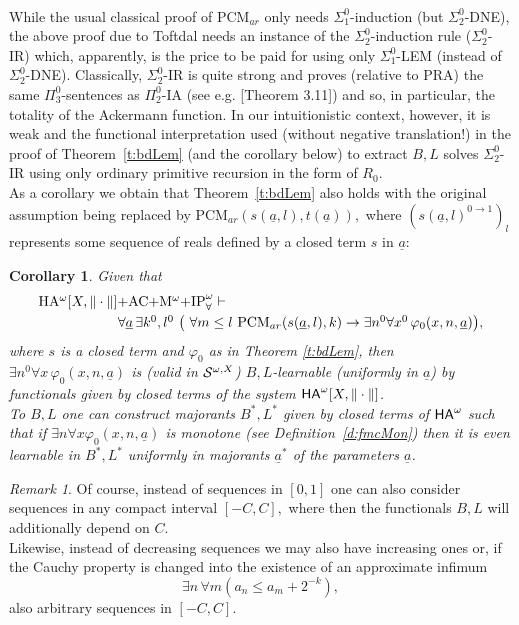 \documentclass[1p]{elsarticle}
\newcommand{\usftext}[1]{\textsf{\upshape #1}}
\newcommand{\ba}{\begin{array}} \newcommand{\ea}{\end{array}}
\newcommand{\ha}{\ensuremath{{\usftext{HA}}^\omega}} %
\newcommand{\tup}{\underline} %
\theoremstyle{plain}
\newtheorem{cor}[thm]{Corollary}
\theoremstyle{definition}
\theoremstyle{remark}
\newtheorem*{remark}{Remark}
\renewcommand{\phi}{\varphi}
\theoremstyle{definition}
\begin{document}
{\mbox{ } 

While the usual classical proof of PCM$_{ar}$ only needs $\Sigma^0_1$-induction 
(but $\Sigma^0_2$-DNE), the above proof due to Toftdal needs an instance of 
the $\Sigma^0_2$-induction rule ($\Sigma^0_2$-IR) which, apparently, is the 
price to be paid for using only $\Sigma^0_1$-LEM (instead of 
$\Sigma^0_2$-DNE). Classically, $\Sigma^0_2$-IR is quite strong and proves 
(relative to PRA) the same $\Pi^0_3$-sentences as $\Pi^0_2$-IA 
(see e.g. \cite{Sieg}[Theorem 3.11]) and so, 
in particular, the totality of the Ackermann function. In our intuitionistic 
context, however, it is weak and the functional interpretation used 
(without negative translation!) in the 
proof of Theorem~\ref{t:bdLem} (and the corollary below) to extract $B,L$ solves 
$\Sigma^0_2$-IR using only ordinary primitive recursion in the form of 
$R_0.$ 
\\[2mm]
As a corollary we obtain that Theorem~\ref{t:bdLem} also holds with 
the original assumption being replaced by 
PCM$_{ar}(s(\underline{a},l),t(\underline{a})),$ where 
$(s(\underline{a},l)^{0\to 1})_l$ represents some sequence of reals defined by 
a closed term $s$ in $\underline{a}:$
\begin{cor}
Given that 
\[\ba{l} \mbox{\rm HA$^{\omega}[X,\|\cdot\|]+$AC$+$M$^{\omega}+
$IP}^{\omega}_{\forall}\vdash \\[1mm] \hspace*{2cm}  
\forall \underline{a}\,\exists k^0 ,l^0\ \big( 
\ \forall m \le l\ \mbox{\rm PCM}_{ar}(s(\underline{a},l),k)
 \rightarrow \exists n^0\forall x^0\,\varphi_0(x,n,\underline{a})\big), 
\ea \] 
where $s$ is a closed term and $\varphi_0$ as in Theorem \ref{t:bdLem}, then 
$\exists n^0\forall x\,\varphi_0(x,n,\underline{a})$ 
is (valid in ${\cal S}^{\omega,X}$) 
$B,L$-learnable (uniformly in $\underline{a}$) by functionals given by 
closed terms of the system $\ha[X,\|\cdot\|]$.\\
To $B,L$ one can construct majorants 
$B^*,L^*$ given by closed terms of $\ha$ such that 
if $\exists n\forall x \phi_0(x,n,\tup a)$ is monotone (see Definition~\ref{d:fmcMon}) then it is even learnable in $B^*,L^*$ uniformly in
majorants $\underline{a}^*$ of the parameters $\underline{a}$.
\end{cor}   
\begin{remark}
Of course, instead of sequences in $[0,1]$ one can also consider sequences 
in any compact interval $[-C,C],$ where then the functionals $B,L$ will 
additionally depend on $C.$ \\[1mm] Likewise, instead of decreasing 
sequences we may also have increasing ones or, if the Cauchy property 
is changed into the existence of an approximate infimum 
\[ \exists n\,\forall m (a_n\le a_m+2^{-k}), \] 
also arbitrary sequences in $[-C,C].$
\end{remark}

}
\end{document}
